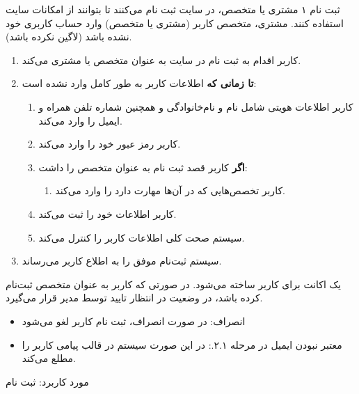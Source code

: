 \usecase
{ثبت نام}
{۱}
{مشتری یا متخصص، در سایت ثبت نام می‌کنند تا بتوانند از امکانات سایت استفاده کنند.}
{مشتری، متخصص}
{}{کاربر (مشتری یا متخصص) وارد حساب کاربری خود نشده باشد (لاگین نکرده باشد).}
{
\vspace*{-0.6cm}
\begin{enumerate}
	\item 
	کاربر اقدام به ثبت نام در سایت به عنوان متخصص یا مشتری می‌کند.
	\item
	\textbf{تا زمانی که} اطلاعات کاربر به طور کامل وارد نشده است:
	
	\begin{enumerate}[label=\theenumi.\arabic*.]
	\item
	کاربر اطلاعات هویتی شامل نام و نام‌خانوادگی و همچنین شماره تلفن همراه و ایمیل را وارد می‌کند.
	\item 
	کاربر رمز عبور خود را وارد می‌کند.
	
	\item 
	\textbf{اگر} کاربر قصد ثبت نام به عنوان متخصص را داشت:
	\begin{enumerate}
		\item 
		کاربر تخصص‌هایی که در آن‌ها مهارت دارد را وارد می‌کند.
	\end{enumerate}

	\item 
	کاربر اطلاعات خود را ثبت می‌کند.
	
	\item 
	سیستم صحت کلی اطلاعات کاربر را کنترل می‌کند.
	\end{enumerate}
	
	\item 
	سیستم ثبت‌نام موفق را به اطلاع کاربر می‌رساند.
	
	
\end{enumerate}
}
{یک اکانت برای کاربر ساخته می‌شود. در صورتی که کاربر به عنوان متخصص ثبت‌نام کرده باشد، در وضعیت در انتظار تایید توسط مدیر قرار می‌گیرد.}
{\begin{itemize}
		\vspace*{-0.6cm}
		\item انصراف: در صورت انصراف، ثبت نام کاربر لغو می‌شود
		\item معتبر نبودن ایمیل در مرحله ۲.۱.: در این صورت سیستم در قالب پیامی کاربر را مطلع می‌کند.
		
		
\end{itemize}}
{مورد کاربرد: ثبت نام}



